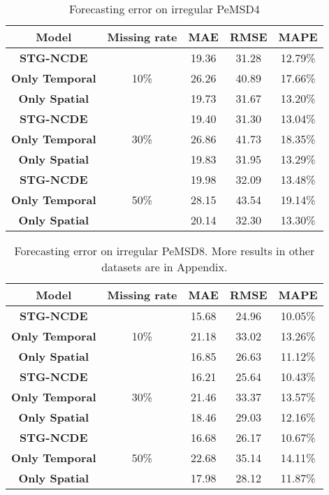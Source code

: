 \documentclass[letterpaper]{article} \usepackage{aaai22}  \usepackage{times}  \usepackage{helvet}  \usepackage{courier}  \usepackage[hyphens]{url}  \usepackage{graphicx} \urlstyle{rm} \def\UrlFont{\rm}  \usepackage{natbib}  \usepackage{caption} \DeclareCaptionStyle{ruled}{labelfont=normalfont,labelsep=colon,strut=off} \frenchspacing  \setlength{\pdfpagewidth}{8.5in}  \setlength{\pdfpageheight}{11in}  \usepackage{stfloats}
\begin{document}
\begin{table}[t]
\centering
\setlength{\tabcolsep}{4pt}
\caption{Forecasting error on irregular PeMSD4}\label{tbl:missing_pemsd4}
\begin{tabular}{cc ccc}
\hline
Model                  & Missing rate         &  MAE   &     RMSE    &   MAPE  \\ \hline
\textbf{STG-NCDE}      & \multirow{3}{*}{10\%}& 19.36  & 31.28  & 12.79\% \\
\textbf{Only Temporal} &                      & 26.26  & 40.89  & 17.66\% \\
\textbf{Only Spatial } &                      & 19.73  & 31.67  & 13.20\% \\\hline
\textbf{STG-NCDE}      & \multirow{3}{*}{30\%}& 19.40  & 31.30  & 13.04\%\\
\textbf{Only Temporal} &                      & 26.86  & 41.73  & 18.35\% \\
\textbf{Only Spatial } &                      & 19.83  & 31.95  & 13.29\% \\\hline
\textbf{STG-NCDE}      & \multirow{3}{*}{50\%}& 19.98  & 32.09  & 13.48\% \\
\textbf{Only Temporal} &                      & 28.15  & 43.54  & 19.14\% \\
\textbf{Only Spatial } &                      & 20.14  & 32.30  & 13.30\% \\\hline
\end{tabular}
\end{table}

\begin{table}[t]
\centering
\setlength{\tabcolsep}{4pt}
\caption{Forecasting error on irregular PeMSD8. More results in other datasets are in Appendix.}\label{tbl:missing_pemsd8}
\begin{tabular}{cc ccc}
\hline
Model                  & Missing rate         &  MAE   &     RMSE    &   MAPE  \\ \hline
\textbf{STG-NCDE}      & \multirow{3}{*}{10\%}& 15.68  & 24.96  & 10.05\% \\
\textbf{Only Temporal} &                      & 21.18  & 33.02  & 13.26\% \\
\textbf{Only Spatial } &                      & 16.85  & 26.63  & 11.12\% \\\hline
\textbf{STG-NCDE}      & \multirow{3}{*}{30\%}& 16.21  & 25.64  & 10.43\% \\
\textbf{Only Temporal} &                      & 21.46  & 33.37  & 13.57\% \\
\textbf{Only Spatial } &                      & 18.46  & 29.03  & 12.16\% \\\hline
\textbf{STG-NCDE}      & \multirow{3}{*}{50\%}& 16.68  & 26.17  & 10.67\% \\
\textbf{Only Temporal} &                      & 22.68  & 35.14  & 14.11\% \\
\textbf{Only Spatial } &                      & 17.98  & 28.12  & 11.87\% \\\hline
\end{tabular}
\end{table}
\end{document}
